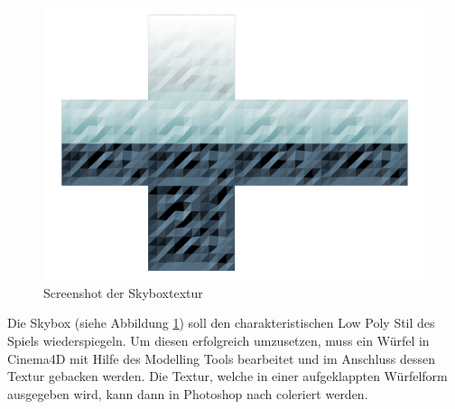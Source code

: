 

\begin{figure}[!htbp]
	\centering
		\includegraphics[width=1.0\textwidth]{images/Skybox}
	\caption{Screenshot der Skyboxtextur}
	\label{fig:Skybox}
\end{figure}

Die Skybox (siehe Abbildung \ref{fig:Skybox}) soll den charakteristischen Low Poly Stil des Spiels wiederspiegeln. Um diesen erfolgreich umzusetzen, muss ein Würfel in Cinema4D mit Hilfe des Modelling Tools bearbeitet und im Anschluss dessen Textur gebacken werden. Die Textur, welche in einer aufgeklappten Würfelform ausgegeben wird, kann dann in Photoshop nach coleriert werden.